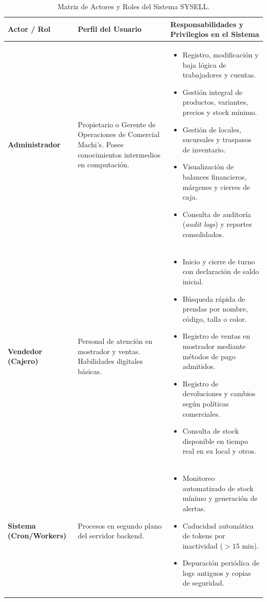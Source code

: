\begin{table}[H]
\centering
\small
\begin{tabularx}{\linewidth}{l>{\raggedright\arraybackslash}p{3.5cm}>{\raggedright\arraybackslash}X}
\toprule
\rowcolor{LightSlate}
\textbf{Actor / Rol} & \textbf{Perfil del Usuario} & \textbf{Responsabilidades y Privilegios en el Sistema} \\
\midrule
\textbf{Administrador} & Propietario o Gerente de Operaciones de Comercial Machi's. Posee conocimientos intermedios en computación. & 
\begin{itemize}[leftmargin=*,noitemsep,topsep=0pt]
    \item Registro, modificación y baja lógica de trabajadores y cuentas.
    \item Gestión integral de productos, variantes, precios y stock mínimo.
    \item Gestión de locales, sucursales y traspasos de inventario.
    \item Visualización de balances financieros, márgenes y cierres de caja.
    \item Consulta de auditoría (\textit{audit logs}) y reportes consolidados.
\end{itemize} \\
\midrule
\textbf{Vendedor (Cajero)} & Personal de atención en mostrador y ventas. Habilidades digitales básicas. & 
\begin{itemize}[leftmargin=*,noitemsep,topsep=0pt]
    \item Inicio y cierre de turno con declaración de saldo inicial.
    \item Búsqueda rápida de prendas por nombre, código, talla o color.
    \item Registro de ventas en mostrador mediante métodos de pago admitidos.
    \item Registro de devoluciones y cambios según políticas comerciales.
    \item Consulta de stock disponible en tiempo real en su local y otros.
\end{itemize} \\
\midrule
\textbf{Sistema (Cron/Workers)} & Procesos en segundo plano del servidor backend. & 
\begin{itemize}[leftmargin=*,noitemsep,topsep=0pt]
    \item Monitoreo automatizado de stock mínimo y generación de alertas.
    \item Caducidad automática de tokens por inactividad ($>15$ min).
    \item Depuración periódica de logs antiguos y copias de seguridad.
\end{itemize} \\
\bottomrule
\end{tabularx}
\caption{Matriz de Actores y Roles del Sistema SYSELL.}
\label{tab:actores_sistema}
\end{table}

